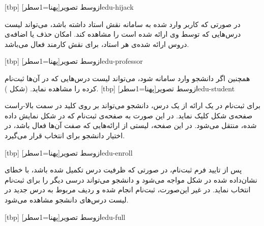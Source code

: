 [tbp]
‌ازوسط
‌تصویر[پهنا=1‌سطر]{edu-hijack}

در صورتی که کاربر وارد شده به سامانه نقش استاد داشته باشد، می‌تواند
لیست درس‌هایی که توسط وی ارائه شده است را مشاهده کند. امکان حذف یا
اضافه‌ی دروس ارائه شده‌ی هر استاد، برای نقش کارمند فعال می‌باشد.

[tbp]
‌ازوسط
‌تصویر[پهنا=1‌سطر]{edu-professor}

همچنین اگر دانشجو وارد سامانه شود، می‌تواند لیست درس‌هایی که در آن‌ها
ثبت‌نام کرده را مشاهده نماید. (شکل ).
[tbp]
‌ازوسط
‌تصویر[پهنا=1‌سطر]{edu-student}

برای ثبت‌نام در یک ارائه از یک درس، دانشجو می‌تواند بر روی کلید در سمت
بالا-راست صفحه‌ی شکل  کلیک نماید. در این صورت به
صفحه‌ی ثبت‌نام که در شکل  نمایش داده شده، منتقل
می‌شود. در این صفحه، لیستی از ارائه‌هایی که صفت  آن‌ها
فعال باشد، در اختیار دانشجو برای انتخاب قرار می‌گیرد.

[tbp]
‌ازوسط
‌تصویر[پهنا=1‌سطر]{edu-enroll}

پس از تایید فرم ثبت‌نام، در صورتی که ظرفیت درس تکمیل شده باشد، با خطای
نشان‌داده شده در شکل  مواجه می‌شود و دانشجو می‌تواند
درسی دیگر را برای ثبت‌نام انتخاب نماید. در غیر این‌صورت، ثبت‌نام انجام
شده و ردیف مربوط به درس جدید در لیست درس‌های دانشجو مشاهده می‌شود.

[tbp]
‌ازوسط
‌تصویر[پهنا=1‌سطر]{edu-full}

                                                                    



